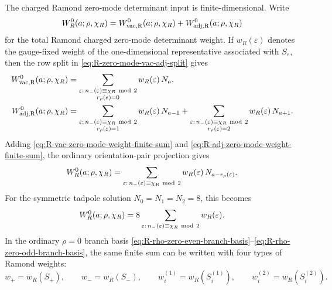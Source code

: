\documentclass[11pt]{article}
\newcommand{\vac}{\mathrm{vac}}
\begin{document}
The charged Ramond zero-mode determinant input is finite-dimensional. Write
\begin{equation}
  W_R^0(a;\rho,\chi_R)
  =
  W_{\vac,\mathrm R}^{0}(a;\rho,\chi_R)
  +
  W_{\rm adj,\mathrm R}^{0}(a;\rho,\chi_R)
  \label{eq:total-R-zero-mode-weight}
\end{equation}
for the total Ramond charged zero-mode determinant weight. If \(w_R(\varepsilon)\) denotes the
gauge-fixed weight of the one-dimensional representative associated with \(S_\varepsilon\), then
the row split in \eqref{eq:R-zero-mode-vac-adj-split} gives
\begin{align}
  W_{\vac,\mathrm R}^{0}(a;\rho,\chi_R)
  &=
  \sum_{\substack{\varepsilon:\,n_-(\varepsilon)\equiv\chi_R\ {\rm mod}\ 2\\
                  r_\rho(\varepsilon)=0}}
  w_R(\varepsilon)\,N_a,
  \label{eq:R-vac-zero-mode-weight-finite-sum}
  \\
  W_{\rm adj,\mathrm R}^{0}(a;\rho,\chi_R)
  &=
  \sum_{\substack{\varepsilon:\,n_-(\varepsilon)\equiv\chi_R\ {\rm mod}\ 2\\
                  r_\rho(\varepsilon)=1}}
  w_R(\varepsilon)\,N_{a-1}
  +
  \sum_{\substack{\varepsilon:\,n_-(\varepsilon)\equiv\chi_R\ {\rm mod}\ 2\\
                  r_\rho(\varepsilon)=2}}
  w_R(\varepsilon)\,N_{a+1}.
  \label{eq:R-adj-zero-mode-weight-finite-sum}
\end{align}
Adding \eqref{eq:R-vac-zero-mode-weight-finite-sum} and
\eqref{eq:R-adj-zero-mode-weight-finite-sum}, the ordinary orientation-pair projection gives
\begin{equation}
  W_R^0(a;\rho,\chi_R)
  =
  \sum_{\varepsilon:\,n_-(\varepsilon)\equiv\chi_R\ {\rm mod}\ 2}
  w_R(\varepsilon)\,N_{a-r_\rho(\varepsilon)} .
  \label{eq:R-zero-mode-weight-finite-sum}
\end{equation}
For the symmetric tadpole solution \(N_0=N_1=N_2=8\), this becomes
\begin{equation}
  W_R^0(a;\rho,\chi_R)
  =
  8
  \sum_{\varepsilon:\,n_-(\varepsilon)\equiv\chi_R\ {\rm mod}\ 2}
  w_R(\varepsilon).
  \label{eq:R-zero-mode-weight-symmetric}
\end{equation}
In the ordinary \(\rho=0\) branch basis
\eqref{eq:R-rho-zero-even-branch-basis}--\eqref{eq:R-rho-zero-odd-branch-basis}, the same finite
sum can be written with four types of Ramond weights:
\begin{equation}
  w_+=w_R(S_+),
  \qquad
  w_-=w_R(S_-),
  \qquad
  w_i^{(1)}=w_R(S_i^{(1)}),
  \qquad
  w_i^{(2)}=w_R(S_i^{(2)}).
  \label{eq:R-rho-zero-weight-names}
\end{equation}
\end{document}
